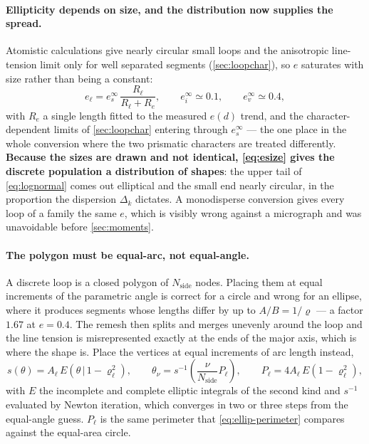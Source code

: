 \documentclass{article}
\begin{document}
\paragraph{Ellipticity depends on size, and the distribution now supplies the
spread.} Atomistic calculations give nearly circular small loops and the
anisotropic line-tension limit only for well separated segments
(\cref{sec:loopchar}), so $e$ saturates with size rather than being a constant:
\begin{equation}
  e_\ell=e^{\infty}_{s}\,\frac{R_\ell}{R_\ell+R_e},
  \qquad
  e^{\infty}_{i}\simeq0.1,
  \qquad
  e^{\infty}_{v}\simeq0.4,
  \label{eq:esize}
\end{equation}
with $R_e$ a single length fitted to the measured $e(d)$ trend, and the
character-dependent limits of \cref{sec:loopchar} entering through
$e^\infty_s$ --- the one place in the whole conversion where the two prismatic
characters are treated differently. \textbf{Because the sizes are drawn and not
identical, \cref{eq:esize} gives the discrete population a distribution of
shapes}: the upper tail of \cref{eq:lognormal} comes out elliptical and the small
end nearly circular, in the proportion the dispersion $\Delta_k$ dictates. A
monodisperse conversion gives every loop of a family the same $e$, which is
visibly wrong against a micrograph and was unavoidable before
\cref{sec:moments}.

\paragraph{The polygon must be equal-arc, not equal-angle.} A discrete loop is
a closed polygon of $N_{\mathrm{side}}$ nodes. Placing them at equal increments
of the parametric angle is correct for a circle and wrong for an ellipse, where
it produces segments whose lengths differ by up to $A/B=1/\varrho$ --- a factor
$1.67$ at $e=0.4$. The remesh then splits and merges unevenly around the loop and
the line tension is misrepresented exactly at the ends of the major axis, which
is where the shape is. Place the vertices at equal increments of arc length
instead,
\begin{equation}
  s(\theta)=A_\ell\,E\!\left(\theta\,\bigl|\,1-\varrho_\ell^2\right),
  \qquad
  \theta_\nu=s^{-1}\!\left(\frac{\nu}{N_{\mathrm{side}}}P_\ell\right),
  \qquad
  P_\ell=4A_\ell\,E\!\left(1-\varrho_\ell^{2}\right),
  \label{eq:arclength}
\end{equation}
with $E$ the incomplete and complete elliptic integrals of the second kind and
$s^{-1}$ evaluated by Newton iteration, which converges in two or three steps
from the equal-angle guess. $P_\ell$ is the same perimeter that
\cref{eq:ellip-perimeter} compares against the equal-area circle.
\end{document}
